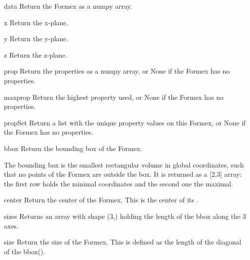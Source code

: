 {{\begin{methoddesc}{data}{}
  Return the Formex as a numpy array.
\end{methoddesc}
\begin{methoddesc}{x}{}
  Return the x-plane.
\end{methoddesc}
\begin{methoddesc}{y}{}
  Return the y-plane.
\end{methoddesc}
\begin{methoddesc}{z}{}
  Return the z-plane.
\end{methoddesc}

\begin{methoddesc}{prop}{}
Return the properties as a numpy array, or None if the Formex has no properties.
\end{methoddesc}

\begin{methoddesc}{maxprop}{}
Return the highest property used, or None if the Formex has no properties.
\end{methoddesc}

\begin{methoddesc}{propSet}{}
Return a list with the unique property values on this Formex, or None if the Formex has no properties.
\end{methoddesc}


\begin{methoddesc}{bbox}{}
Return the bounding box of the Formex.

The bounding box is the smallest rectangular volume in global coordinates, such that no points of the Formex are outside the box. It is returned as a [2,3] array: the first row holds the minimal coordinates and the second one the maximal.
\end{methoddesc}

\begin{methoddesc}{center}{}
Return the center of the Formex. This is the center of its .
\end{methoddesc}

\begin{methoddesc}{sizes}{}
Returns an array with shape (3,) holding the length of the bbox along the 3 axes.
\end{methoddesc}

\begin{methoddesc}{size}{}
Return the size of the Formex. This is defined as the length of the diagonal of the bbox().
\end{methoddesc}

}}
